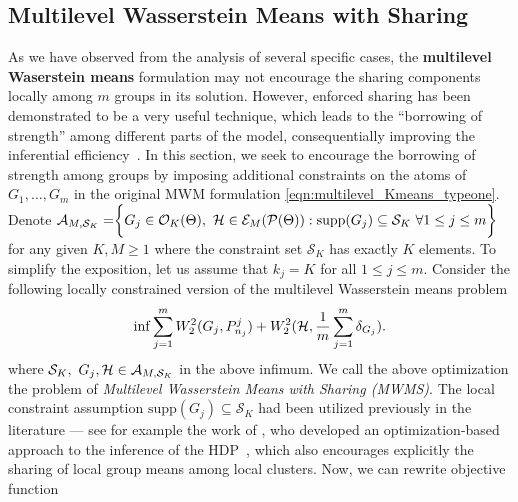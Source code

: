 \subsection{Multilevel Wasserstein Means with Sharing} \label{Section:constraint_multilevels_Kmeans}
As we have observed from the analysis of several specific cases,
the {\bf multilevel Waserstein means} formulation
may not encourage the sharing components locally among $m$ groups in its solution.
However, enforced sharing has been demonstrated to be a very useful technique, which
leads to the ``borrowing of strength'' among different parts of the model, consequentially
improving the inferential efficiency~\citep{Teh-etal-06,Nguyen-2016}. In this section, 
we seek to encourage the borrowing of strength among groups by imposing additional
constraints on the atoms of $G_{1},\ldots,G_{m}$ in the original MWM
formulation \eqref{eqn:multilevel_Kmeans_typeone}. Denote $\mathcal{A}_{M,
\mathcal{S}_{K}}=\biggr\{G_{j} \in \mathcal{O}_{K}(\Theta), \ \Hcal \in \mathcal{E}_{M}
(\mathcal{P}(\Theta)): \text{supp}(G_{j}) \subseteq \mathcal{S}_{K}\ \forall 1 \leq j \leq 
m \biggr\}$
for any given $K, M \geq 1$ where the constraint set $\mathcal{S}_{K}$ has exactly $K$ 
elements. To simplify the exposition, let us assume that $k_{j}=K$ for all $1 
\leq j \leq m$. Consider the following locally constrained version of the
multilevel Wasserstein means problem
\begin{eqnarray}
\mathop {\inf }{\mathop {\sum }\limits_{j=1}^{m}{W_{2}^{2}(G_{j},P_{n_{j}}^{j})}}
+W_{2}^{2}(\mathcal{H},\dfrac{1}{m}\mathop {\sum }\limits_{j=1}^{m}{\delta_{G_{j}}}). \label{eqn:local_constraint_multilevels_Kmeans_typeone}
\end{eqnarray}
where $\mathcal{S}_{K}, \ G_{j},\mathcal{H} \in \mathcal{A}_{M,\mathcal{S}_{K}}$ in the above infimum. We call the above optimization the problem of \emph{Multilevel Wasserstein Means with Sharing (MWMS)}. The 
local constraint assumption $\text{supp}(G_{j})\subseteq \mathcal{S}_{K}$ had been 
utilized previously in the literature --- see for example the work of \citep{Kulis-2012}, 
who developed an optimization-based approach to the inference of the HDP~\citep{Teh-etal-06},
which also encourages explicitly the sharing of local group means among local clusters. 
Now, we can rewrite objective function 
